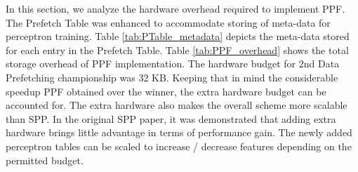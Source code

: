 In this section, we analyze the hardware overhead required to
implement PPF.  The Prefetch Table was enhanced to accommodate
storing of meta-data for perceptron training.  Table
\ref{tab:PTable_metadata} depicts the meta-data stored for each entry in
the Prefetch Table.  Table \ref{tab:PPF_overhead} shows the total
storage overhead of PPF implementation.  The hardware budget for
2nd Data Prefetching championship was 32 KB.  Keeping that in mind 
the considerable speedup PPF obtained over the winner, the extra hardware
budget can be accounted for.  The extra hardware also makes the
overall scheme more scalable than SPP.  In the original SPP paper, it
was demonstrated that adding extra hardware brings little advantage in
terms of performance gain.  The newly added perceptron tables can be
scaled to increase / decrease features depending on the permitted
budget.


